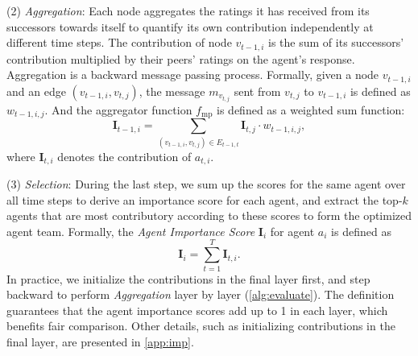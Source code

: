 \documentclass{article} %
\begin{document}
(2) \textit{Aggregation}: Each node aggregates the ratings it has received from its successors towards itself to quantify its own contribution independently at different time steps. The contribution of node $v_{t-1,i}$ is the sum of its successors' contribution multiplied by their peers' ratings on the agent's response. Aggregation is a backward message passing process. Formally, given a node $v_{t-1,i}$ and an edge $(v_{t-1, i}, v_{t,j})$, the message $m_{v_{t,j}}$ sent from $v_{t, j}$ to $v_{t-1,i}$ is defined as $w_{t-1,i,j}$. And the aggregator function $f_{\mathrm{mp}}$ is defined as a weighted sum function: 
\begin{equation}\label{eqn:imp-score}
    \bm{I}_{t-1,i} = \sum_{(v_{t-1,i}, v_{t,j})\in E_{t-1,t}}  \bm{I}_{t,j} \cdot w_{t-1,i,j},
\end{equation}
where $\bm{I}_{t,i}$ denotes the contribution of $a_{t,i}$. 

(3) \textit{Selection}: During the last step, we sum up the scores for the same agent over all time steps to derive an importance score for each agent,  and extract the top-$k$ agents that are most contributory according to these scores to form the optimized agent team. Formally, the \textit{Agent Importance Score} $\bm{I}_{i}$ for agent $a_i$ is defined as 
\begin{equation}
    \bm{I}_{i} = \sum_{t=1}^T \bm{I}_{t, i}.
\end{equation}
In practice, we initialize the contributions in the final layer first, and step backward to perform \textit{Aggregation} layer by layer (\cref{alg:evaluate}). 
The definition guarantees that the agent importance scores add up to 1 in each layer, which benefits fair comparison. 
Other details, such as initializing contributions in the final layer, are presented in \cref{app:imp}.
\end{document}
